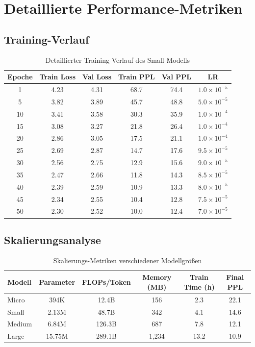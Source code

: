 \section{Detaillierte Performance-Metriken}

\subsection{Training-Verlauf}

\begin{table}[h]
\centering
\small
\begin{tabular}{|c|c|c|c|c|c|}
\hline
\textbf{Epoche} & \textbf{Train Loss} & \textbf{Val Loss} & \textbf{Train PPL} & \textbf{Val PPL} & \textbf{LR} \\
\hline
1 & 4.23 & 4.31 & 68.7 & 74.4 & $1.0 \times 10^{-5}$ \\
5 & 3.82 & 3.89 & 45.7 & 48.8 & $5.0 \times 10^{-5}$ \\
10 & 3.41 & 3.58 & 30.3 & 35.9 & $1.0 \times 10^{-4}$ \\
15 & 3.08 & 3.27 & 21.8 & 26.4 & $1.0 \times 10^{-4}$ \\
20 & 2.86 & 3.05 & 17.5 & 21.1 & $1.0 \times 10^{-4}$ \\
25 & 2.69 & 2.87 & 14.7 & 17.6 & $9.5 \times 10^{-5}$ \\
30 & 2.56 & 2.75 & 12.9 & 15.6 & $9.0 \times 10^{-5}$ \\
35 & 2.47 & 2.66 & 11.8 & 14.3 & $8.5 \times 10^{-5}$ \\
40 & 2.39 & 2.59 & 10.9 & 13.3 & $8.0 \times 10^{-5}$ \\
45 & 2.34 & 2.55 & 10.4 & 12.8 & $7.5 \times 10^{-5}$ \\
50 & 2.30 & 2.52 & 10.0 & 12.4 & $7.0 \times 10^{-5}$ \\
\hline
\end{tabular}
\caption{Detaillierter Training-Verlauf des Small-Modells}
\label{tab:detailed_training_progress}
\end{table}

\subsection{Skalierungsanalyse}

\begin{table}[h]
\centering
\begin{tabular}{|l|c|c|c|c|c|}
\hline
\textbf{Modell} & \textbf{Parameter} & \textbf{FLOPs/Token} & \textbf{Memory (MB)} & \textbf{Train Time (h)} & \textbf{Final PPL} \\
\hline
Micro & 394K & 12.4B & 156 & 2.3 & 22.1 \\
Small & 2.13M & 48.7B & 342 & 4.1 & 14.6 \\
Medium & 6.84M & 126.3B & 687 & 7.8 & 12.1 \\
Large & 15.75M & 289.1B & 1,234 & 13.2 & 10.9 \\
\hline
\end{tabular}
\caption{Skalierungs-Metriken verschiedener Modellgrößen}
\label{tab:scaling_metrics}
\end{table}

